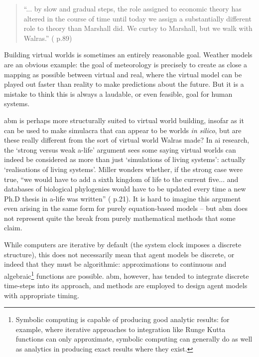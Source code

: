 \begin{quote}
``... by slow and gradual steps, the role assigned to economic theory has altered in the course of time until today we assign a substantially different role to theory than Marshall did. We curtsy to Marshall, but we walk with Walras.'' (\citealt{friedman_essays_1953} p.89)
\end{quote}


Building virtual worlds is sometimes an entirely reasonable goal. Weather models are an obvious example: the goal of meteorology is precisely to create as close a mapping as possible between virtual and real, where the virtual model can be played out faster than reality to make predictions about the future. But it is a mistake to think this is always a laudable, or even feasible, goal for human systems.

\gls{abm} is perhaps more structurally suited to virtual world building, insofar as it can be used to make simulacra that can appear to be worlds \emph{in silico}, but are these really different from the sort of virtual world Walras made? In \gls{ai} research, the `strong versus weak a-life' argument sees some saying virtual worlds can indeed be considered as more than just `simulations of living systems': actually `realisations of living systems'. Miller wonders whether, if the strong case were true, ``we would have to add a sixth kingdom of life to the current five... and databases of biological phylogenies would have to be updated every time a new Ph.D thesis in a-life was written'' (\citealt{miller_artificial_1995} p.21). It is hard to imagine this argument even arising in the same form for purely equation-based models – but \gls{abm} does not represent quite the break from purely mathematical methods that some claim. 

While computers are iterative by default (the system clock imposes a discrete structure), this does not necessarily mean that agent models  be discrete, or indeed that they must be algorithmic: approximations to continuous and algebraic\footnote{Symbolic computing is capable of producing good analytic results: for example, where iterative approaches to integration like Runge Kutta functions can only approximate, symbolic computing can generally do as well as analytics in producing exact results where they exist.} functions are possible. \gls{abm}, however, has tended to integrate discrete time-steps into its approach, and methods are employed to design agent models with appropriate timing. 

